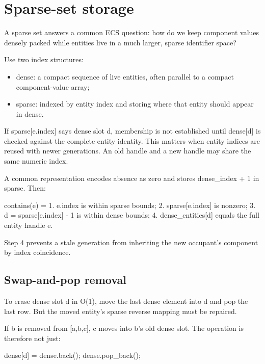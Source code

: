 \hypertarget{appendix-8404d0b1a3e7}{}\label{referencestart:appendix-8404d0b1a3e7}
\section{Sparse-set storage}\label{appendix-8404d0b1a3e7-sparse-set-storage}

A sparse set answers a common ECS question: how do we keep component values densely packed while entities live in a much larger, sparse identifier space?

Use two index structures:

\begin{itemize}
\tightlist
\item
  dense: a compact sequence of live entities, often parallel to a compact component-value array;
\item
  sparse: indexed by entity index and storing where that entity should appear in dense.
\end{itemize}

If sparse{[}e.index{]} says dense slot d, membership is not established until dense{[}d{]} is checked against the complete entity identity. This matters when entity indices are reused with newer generations. An old handle and a new handle may share the same numeric index.

A common representation encodes absence as zero and stores dense\_index + 1 in sparse. Then:

contains(e) = 1. e.index is within sparse bounds; 2. sparse{[}e.index{]} is nonzero; 3. d = sparse{[}e.index{]} - 1 is within dense bounds; 4. dense\_entities{[}d{]} equals the full entity handle e.

Step 4 prevents a stale generation from inheriting the new occupant's component by index coincidence.

\subsection{Swap-and-pop removal}\label{appendix-8404d0b1a3e7-swap-and-pop-removal}

To erase dense slot d in O(1), move the last dense element into d and pop the last row. But the moved entity's sparse reverse mapping must be repaired.

If b is removed from {[}a,b,c{]}, c moves into b's old dense slot. The operation is therefore not just:

dense{[}d{]} = dense.back(); dense.pop\_back();


